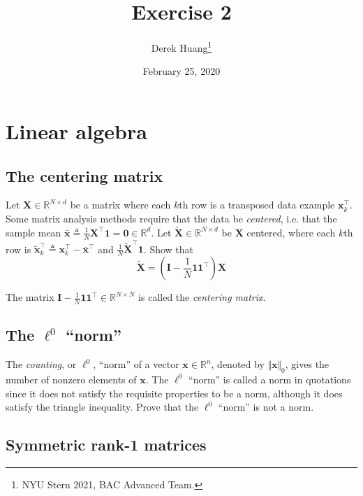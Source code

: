 \documentclass{article}
\title{Exercise 2}
\author{Derek Huang\thanks{NYU Stern 2021, BAC Advanced Team.}}
\date{February 25, 2020}
\numberwithin{equation}{section}
\begin{document}
\maketitle
\thispagestyle{fancy}

\section{Linear algebra}

\subsection{The centering matrix}

Let $ \mathbf{X} \in \mathbb{R}^{N \times d} $ be a matrix where each $ k $th
row is a transposed data example $ \mathbf{x}_k^\top $. Some matrix analysis
methods require that the data be \textit{centered}, i.e. that the sample mean
$ \bar{\mathbf{x}} \triangleq \frac{1}{N}\mathbf{X}^\top\mathbf{1} =
\mathbf{0} \in \mathbb{R}^d $. Let $ \tilde{\mathbf{X}} \in
\mathbb{R}^{N \times d} $ be $ \mathbf{X} $ centered, where each $ k $th row
is $ \tilde{\mathbf{x}}_k^\top \triangleq \mathbf{x}_k^\top -
\bar{\mathbf{x}}^\top $ and $ \frac{1}{N}\tilde{\mathbf{X}}^\top\mathbf{1} $.
Show that 
\begin{equation*}
    \tilde{\mathbf{X}} = \left(
        \mathbf{I} - \frac{1}{N}\mathbf{11}^\top
    \right)\mathbf{X}
\end{equation*}

The matrix $ \mathbf{I} - \frac{1}{N}\mathbf{11}^\top \in
\mathbb{R}^{N \times N} $ is called the \textit{centering matrix}.

\subsection{The $ \ell^0 $ ``norm''}

The \textit{counting}, or $ \ell^0 $, ``norm'' of a vector $ \mathbf{x} \in
\mathbb{R}^n $, denoted by $ \Vert\mathbf{x}\Vert_0 $, gives the number of
nonzero elements of $ \mathbf{x} $. The $ \ell^0 $ ``norm'' is called a norm
in quotations since it does not satisfy the requisite properties to be a norm,
although it does satisfy the triangle inequality. Prove that the $ \ell^0 $
``norm'' is not a norm.

\subsection{Symmetric rank-1 matrices}
\end{document}
